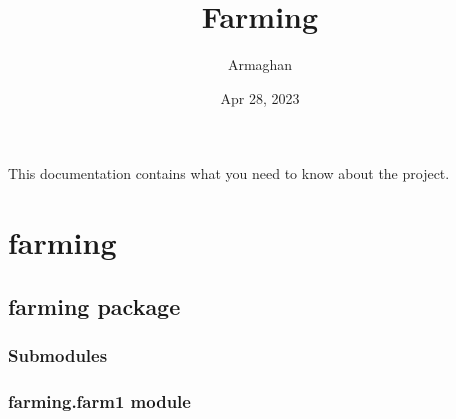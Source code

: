 \documentclass[letterpaper,10pt,english]{sphinxmanual}
\title{Farming}
\date{Apr 28, 2023}
\author{Armaghan}
\begin{document}
\pagestyle{empty}
\sphinxmaketitle
\pagestyle{plain}
\sphinxtableofcontents
\pagestyle{normal}
\label{\detokenize{index::doc}}


\sphinxAtStartPar
This documentation contains what you need to know about the
 project.


\chapter{farming}
\label{\detokenize{modules:farming}}\label{\detokenize{modules::doc}}

\section{farming package}
\label{\detokenize{farming:farming-package}}\label{\detokenize{farming::doc}}

\subsection{Submodules}
\label{\detokenize{farming:submodules}}

\subsection{farming.farm1 module}
\label{\detokenize{farming:module-farming.farm1}}\label{\detokenize{farming:farming-farm1-module}}
\end{document}
